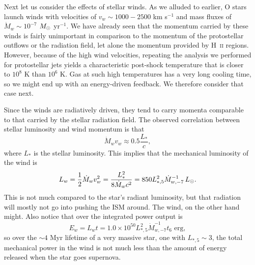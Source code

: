 Next let us consider the effects of stellar winds. As we alluded to earlier, O stars launch winds with velocities of $v_w \sim 1000-2500$ km s$^{-1}$ and mass fluxes of $\dot{M}_w \sim 10^{-7}$ $M_{\odot}$ yr$^{-1}$. We have already seen that the momentum carried by these winds is fairly unimportant in comparison to the momentum of the protostellar outflows or the radiation field, let alone the momentum provided by H~\textsc{ii} regions. However, because of the high wind velocities, repeating the analysis we performed for protostellar jets yields a characteristic post-shock temperature that is closer to $10^8$ K than $10^6$ K. Gas at such high temperatures has a very long cooling time, so we might end up with an energy-driven feedback. We therefore consider that case next.

Since the winds are radiatively driven, they tend to carry momenta comparable to that carried by the stellar radiation field. The observed correlation between stellar luminosity and wind momentum \citep[e.g.,][]{repolust04a} is that
\begin{equation}
\dot{M}_w v_w \approx 0.5 \frac{L_*}{c},
\end{equation}
where $L_*$ is the stellar luminosity. This implies that the mechanical luminosity of the wind is
\begin{equation}
L_w = \frac{1}{2} \dot{M}_w v_w^2 = \frac{L_*^2}{8 \dot{M}_w c^2} = 850 L_{*,5}^2 \dot{M}_{w,-7}^{-1} \, L_{\odot}.
\end{equation}
This is not much compared to the star's radiant luminosity, but that radiation will mostly not go into pushing the ISM around. The wind, on the other hand might. Also notice that over the integrated power output is
\begin{equation}
E_w = L_w t = 1.0\times 10^{50}  L_{*,5}^2 \dot{M}_{w,-7}^{-1} t_6\mbox{ erg},
\end{equation}
so over the $\sim 4$ Myr lifetime of a very massive star, one with $L_{*,5}\sim 3$, the total mechanical power in the wind is not much less than the amount of energy released when the star goes supernova.

